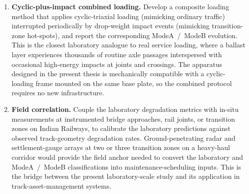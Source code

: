 \begin{enumerate}[label=(\arabic*),leftmargin=*,itemsep=6pt]
    \item \textbf{Cyclic-plus-impact combined loading.} Develop a
          composite loading method that applies cyclic-triaxial loading
          (mimicking ordinary traffic) interrupted periodically by
          drop-weight impact events (mimicking transition-zone hot-spots),
          and report the corresponding
          \gls{ModeA}~/~\gls{ModeB} evolution. This is the closest
          laboratory analogue to real service loading, where a ballast
          layer experiences thousands of routine axle passages interspersed
          with occasional high-energy impacts at joints and crossings.
          The apparatus designed in the present thesis is mechanically
          compatible with a cyclic-loading frame mounted on the same
          base plate, so the combined protocol requires no new
          infrastructure.

    \item \textbf{Field correlation.} Couple the laboratory degradation
          metrics with in-situ measurements at instrumented bridge
          approaches, rail joints, or transition zones on Indian
          Railways, to calibrate the laboratory predictions against
          observed track-geometry degradation rates. Ground-penetrating
          radar and settlement-gauge arrays at two or three transition
          zones on a heavy-haul corridor would provide the field anchor
          needed to convert the laboratory \FIIN{} and \gls{ModeA}~/~\gls{ModeB}
          classifications into maintenance-scheduling inputs. This is
          the bridge between the present laboratory-scale study and its
          application in track-asset-management systems.
\end{enumerate}
